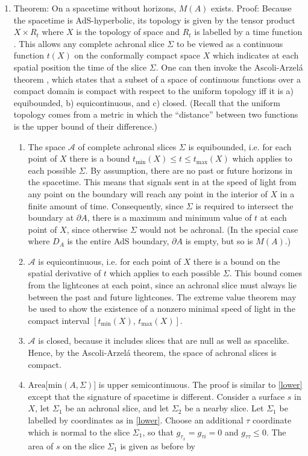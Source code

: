 \documentclass{article}
\begin{document}
\begin{enumerate}[resume]
\item \label{Mexists} Theorem: On a spacetime without horizons, $M(A)$ exists.  Proof: Because the spacetime is AdS-hyperbolic, its topology is given by the tensor product $X \times R_t$ where $X$ is the topology of space and $R_t$ is labelled by a time function \cite{geroch67}.  This allows any complete achronal slice $\Sigma$ to be viewed as a continuous function $t(X)$ on the conformally compact space $X$ which indicates at each spatial position the time of the slice $\Sigma$.  One can then invoke the Ascoli-Arzel\'{a} theorem \cite{AA}, which states that a subset of a space of continuous functions over a compact domain is compact with respect to the uniform topology iff it is a) equibounded, b) equicontinuous, and c) closed.  (Recall that the uniform topology comes from a metric in which the ``distance'' between two functions is the upper bound of their difference.)
	\begin{enumerate}
	\item \label{equib} The space $\mathcal{A}$ of complete achronal slices $\Sigma$ is equibounded, i.e. for each point of $X$ there is a bound $t_\mathrm{min}(X) \le t \le t_\mathrm{max}(X)$ which applies to each possible $\Sigma$.  By assumption, there are no past or future horizons in the spacetime.  This means that signals sent in at the speed of light from any point on the boundary will reach any point in the interior of $X$ in a finite amount of time.  Consequently, since $\Sigma$ is required to intersect the boundary at $\partial A$, there is a maximum and minimum value of $t$ at each point of $X$, since otherwise $\Sigma$ would not be achronal.  (In the special case where $D_A$ is the entire AdS boundary, $\partial A$ is empty, but so is $M(A)$.)
	\item $\mathcal{A}$ is equicontinuous, i.e. for each point of $X$ there is a bound on the spatial derivative of $t$ which applies to each possible $\Sigma$.  This bound comes from the lightcones at each point, since an achronal slice must always lie between the past and future lightcones.  The extreme value theorem may be used to show the existence of a nonzero minimal speed of light in the compact interval $[t_\mathrm{min}(X),\, t_\mathrm{max}(X)]$.
	\item $\mathcal{A}$ is closed, because it includes slices that are null as well as spacelike.  Hence, by the Ascoli-Arzel\'{a} theorem, the space of achronal slices is compact.
	\item \label{upper} $\mathrm{Area[min}(A,\Sigma)]$ is upper semicontinuous.  The proof is similar to \ref{lower} except that the signature of spacetime is different.  Consider a surface $s$ in $X$, let $\Sigma_1$ be an achronal slice, and let $\Sigma_2$ be a nearby slice.  Let $\Sigma_1$ be labelled by coordinates as in \ref{lower}.  Choose an additional $\tau$ coordinate which is normal to the slice $\Sigma_1$, so that $g_{\tau_x} = g_{\tau i} = 0$ and $g_{\tau\tau} \le 0$.   The area of $s$ on the slice $\Sigma_1$ is given as before by

\end{enumerate}
\end{enumerate}
\end{document}

